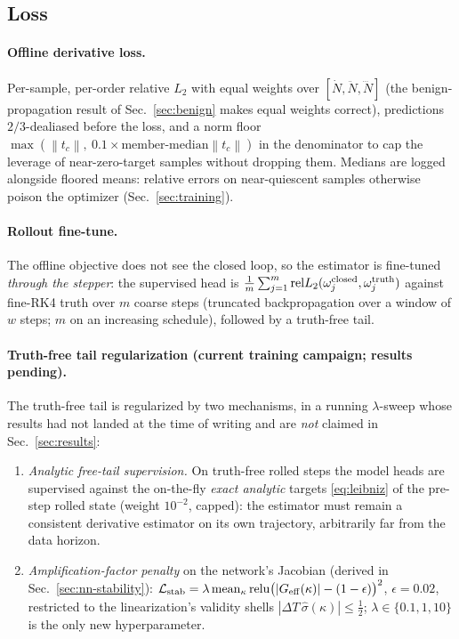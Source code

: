 \documentclass[11pt]{article}
\theoremstyle{plain}
\theoremstyle{definition}
\newcommand{\Ndot}{\dot{N}}
\newcommand{\Nddot}{\ddot{N}}
\newcommand{\Ndddot}{\dddot{N}}
\newcommand{\DT}{\Delta T}
\newcommand{\norm}[1]{\left\lVert #1 \right\rVert}
\newcommand{\shat}{\hat{\sigma}}
\begin{document}
\subsection{Loss}
\label{sec:loss}

\paragraph{Offline derivative loss.}
Per-sample, per-order relative $L_2$ with equal weights over
$[\Ndot,\Nddot,\Ndddot]$ (the benign-propagation result of Sec.~\ref{sec:benign} makes equal
weights correct), predictions $2/3$-dealiased before the loss, and a norm floor
$\max(\norm{t_c},\ 0.1\times\text{member-median}\norm{t_c})$ in the
denominator to cap the leverage of near-zero-target samples without dropping
them. Medians are logged alongside floored means: relative errors on
near-quiescent samples otherwise poison the optimizer (Sec.~\ref{sec:training}).

\paragraph{Rollout fine-tune.}
The offline objective does not see the closed loop, so the estimator is
fine-tuned \emph{through the stepper}: the supervised head is
$\frac1m\sum_{j=1}^m\mathrm{rel}L_2(\omega^{\rm closed}_j,\omega^{\rm truth}_j)$
against fine-RK4 truth over $m$ coarse steps (truncated backpropagation over
a window of $w$ steps; $m$ on an increasing schedule), followed by a
truth-free tail.

\paragraph{Truth-free tail regularization (current training campaign;
results pending).}
The truth-free tail is regularized by two mechanisms, in a running
$\lambda$-sweep whose results had not landed at the time of writing and are
\emph{not} claimed in Sec.~\ref{sec:results}:
\begin{enumerate}[leftmargin=1.6em,nosep,topsep=2pt]
\item \emph{Analytic free-tail supervision.} On truth-free rolled steps the
model heads are supervised against the on-the-fly \emph{exact analytic}
targets \eqref{eq:leibniz} of the pre-step rolled state (weight
$10^{-2}$, capped): the estimator must remain a consistent derivative
estimator on its own trajectory, arbitrarily far from the data horizon.
\item \emph{Amplification-factor penalty} on the network's Jacobian (derived in
Sec.~\ref{sec:nn-stability}):
$\mathcal L_{\rm stab}
=\lambda\,\mathrm{mean}_\kappa\,\mathrm{relu}\big(|G_{\rm eff}(\kappa)|
-(1-\epsilon)\big)^2$, $\epsilon=0.02$, restricted to the linearization's
validity shells $|\DT\,\shat(\kappa)|\le\tfrac12$;
$\lambda\in\{0.1,1,10\}$ is the only new hyperparameter.
\end{enumerate}
\end{document}
